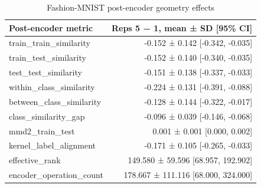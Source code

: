 \begin{table}
\caption{Fashion-MNIST post-encoder geometry effects}
\label{tab:satml_fashion_geometry}
\begin{tabular}{lr}
\toprule
Post-encoder metric & Reps 5 − 1, mean ± SD [95\% CI] \\
\midrule
train\_train\_similarity & -0.152 ± 0.142 [-0.342, -0.035] \\
train\_test\_similarity & -0.152 ± 0.140 [-0.340, -0.035] \\
test\_test\_similarity & -0.151 ± 0.138 [-0.337, -0.033] \\
within\_class\_similarity & -0.224 ± 0.131 [-0.391, -0.088] \\
between\_class\_similarity & -0.128 ± 0.144 [-0.322, -0.017] \\
class\_similarity\_gap & -0.096 ± 0.039 [-0.146, -0.068] \\
mmd2\_train\_test & 0.001 ± 0.001 [0.000, 0.002] \\
kernel\_label\_alignment & -0.171 ± 0.105 [-0.265, -0.033] \\
effective\_rank & 149.580 ± 59.596 [68.957, 192.902] \\
encoder\_operation\_count & 178.667 ± 111.116 [68.000, 324.000] \\
\bottomrule
\end{tabular}
\end{table}



